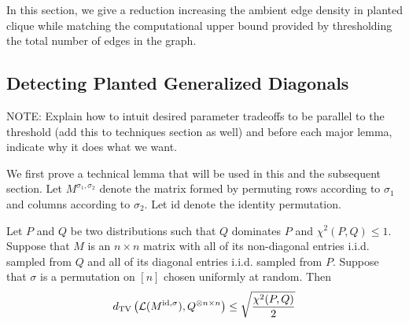 \documentclass[11pt]{article}
\begin{document}
In this section, we give a reduction increasing the ambient edge density in planted clique while matching the computational upper bound provided by thresholding the total number of edges in the graph. 

\subsection{Detecting Planted Generalized Diagonals}

NOTE: Explain how to intuit desired parameter tradeoffs to be parallel to the threshold (add this to techniques section as well) and before each major lemma, indicate why it does what we want.

We first prove a technical lemma that will be used in this and the subsequent section. Let $M^{\sigma_1, \sigma_2}$ denote the matrix formed by permuting rows according to $\sigma_1$ and columns according to $\sigma_2$. Let $\text{id}$ denote the identity permutation.

\begin{lemma}
Let $P$ and $Q$ be two distributions such that $Q$ dominates $P$ and $\chi^2(P, Q) \le 1$. Suppose that $M$ is an $n \times n$ matrix with all of its non-diagonal entries i.i.d. sampled from $Q$ and all of its diagonal entries i.i.d. sampled from $P$. Suppose that $\sigma$ is a permutation on $[n]$ chosen uniformly at random. Then
$$d_{\text{TV}}\left( \mathcal{L}(M^{\text{id},\sigma}), Q^{\otimes n \times n} \right) \le \sqrt{\frac{\chi^2(P, Q)}{2}}$$
\end{lemma}
\end{document}

